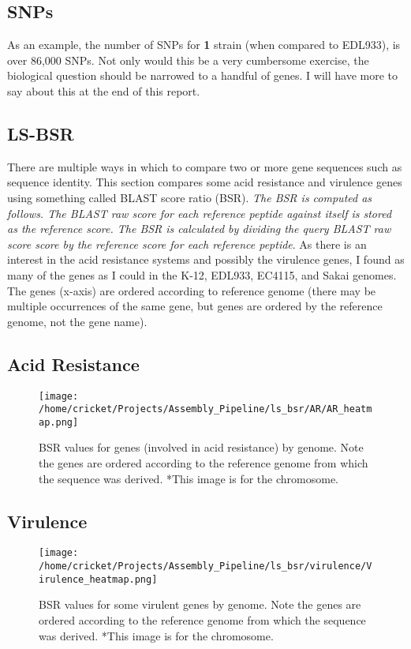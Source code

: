 \documentclass[11pt]{article}
\begin{document}
\subsection*{SNPs}
As an example, the number of SNPs for \textbf{1} strain (when compared to EDL933), is over 86,000 SNPs. Not only would this be a very cumbersome exercise, the biological question should be narrowed to a handful of genes. I will have more to say about this at the end of this report. \\

\subsection*{LS-BSR}
There are multiple ways in which to compare two or more gene sequences such as sequence identity. This section compares some acid resistance and virulence genes using something called BLAST score ratio (BSR). \textit{The BSR is computed as follows. The BLAST raw score for each reference peptide against itself is stored as the reference score. The BSR is calculated by dividing the query BLAST raw score score by the reference score for each reference peptide}. As there is an interest in the acid resistance systems and possibly the virulence genes, I found as many of the genes as I could in the K-12, EDL933, EC4115, and Sakai genomes. The genes (x-axis) are ordered according to reference genome (there may be multiple occurrences of the same gene, but genes are ordered by the reference genome, not the gene name).

\subsection*{Acid Resistance}
\begin{figure}[h!]\normalsize %
\centering
\texttt{[image: /home/cricket/Projects/Assembly\_Pipeline/ls\_bsr/AR/AR\_heatmap.png]}
\caption{BSR values for genes (involved in acid resistance) by genome. Note the genes are ordered according to the reference genome from which the sequence was derived. *This image is for the chromosome.}
\label{ARheatmap}
\end{figure}
\clearpage

\subsection*{Virulence}
\begin{figure}[ht!]\normalsize %
\centering
\texttt{[image: /home/cricket/Projects/Assembly\_Pipeline/ls\_bsr/virulence/Virulence\_heatmap.png]}
\caption{BSR values for some virulent genes by genome. Note the genes are ordered according to the reference genome from which the sequence was derived. *This image is for the chromosome.}
\label{VirrulenceHeatMap}
\end{figure}
\end{document}
